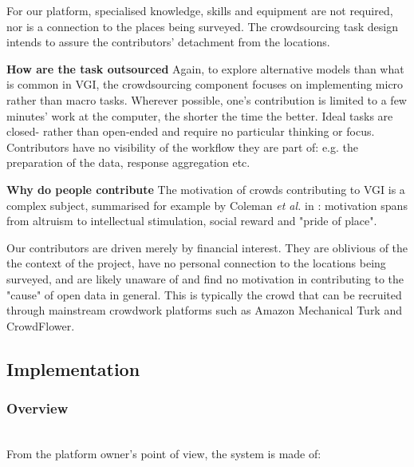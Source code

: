For our platform, specialised knowledge, skills and equipment are not required, nor is a connection to the places being surveyed. The crowdsourcing task design intends to assure the contributors' detachment from the locations.

\textbf{How are the task outsourced} Again, to explore alternative models than what is common in VGI, the crowdsourcing component focuses on implementing micro rather than macro tasks. Wherever possible, one's contribution is limited to a few minutes' work at the computer, the shorter the time the better. Ideal tasks are closed- rather than open-ended and require no particular thinking or focus. Contributors have no visibility of the workflow they are part of: e.g. the preparation of the data, response aggregation etc. 

\textbf{Why do people contribute} The motivation of crowds contributing to VGI is a complex subject, summarised for example by Coleman {\it et al.} in \cite{Coleman:2009vd}: motivation spans from altruism to intellectual stimulation, social reward and "pride of place". 

Our contributors are driven merely by financial interest. They are oblivious of the the context of the project, have no personal connection to the locations being surveyed, and are likely unaware of and find no motivation in contributing to the "cause" of open data in general. This is typically the crowd that can be recruited through mainstream crowdwork platforms such as Amazon Mechanical Turk and CrowdFlower. 

\subsection{Implementation}

\subsubsection{Overview} \leavevmode \\ %

From the platform owner's point of view, the system is made of:

